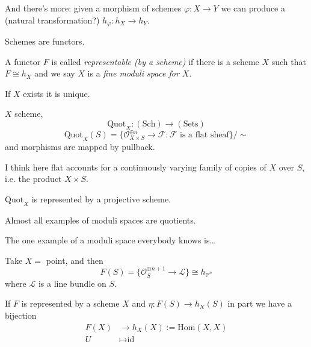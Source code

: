 And there's more: given a morphism of schemes $\varphi:X\to Y$ we can produce a
(natural transformation?) $h_\varphi:h_X \to h_Y$.

\begin{slogan}
Schemes are functors.
\end{slogan}

\begin{definition}
\label{definition-representable-functor-by-scheme}
A functor $F$ is called {\it representable (by a scheme)} if there is a scheme
$X$ such that $F\cong h_X$ and we say $X$ is a {\it fine moduli space for $X$}.
\end{definition}

\begin{remark}
\label{remark-uniqueness-of-representable-functor}
If $X$ exists it is unique.
\end{remark}

\begin{example}
\label{example-quotient-sheaf}
$X$ scheme,
$$
\text{Quot}_X:(\text{Sch})\to (\text{Sets})
$$
$$
\text{Quot}_X(S)=\{
\mathcal{O}_{X \times S}^{\oplus n}\to\mathcal{F}
:\mathcal{F} \text{ is a flat sheaf}\}\Big/ \sim
$$
and morphisms are mapped by pullback.
\end{example}

I think here flat accounts for a continuously varying family of copies of $X$
over $S$, i.e. the product $X \times S$.

\begin{theorem}
\label{theorem-Quot-is-represented}
$\text{Quot}_X$ is represented by a projective scheme.
\end{theorem}

Almost all examples of moduli spaces are quotients.

\medskip\noindent

The one example of a moduli space everybody knows is…

\begin{example}
\label{example-projective-space-is-a-quotient}
Take $X=$ point, and then
$$
F(S)=\{\mathcal{O}_S^{\oplus n+1}\to \mathcal{L}\}\cong h_{\mathbb{P}^n}
$$
where $\mathcal{L}$ is a line bundle on $S$.
\end{example}

\begin{definition}
\label{definition-universal-family}
If $F$ is represented by a scheme $X$ and $\eta:F(S)\to h_X(S)$ in part we have
a bijection
\begin{align*}
F(X) &\longrightarrow h_X(X):=\text{Hom}(X,X) \\
U &\longmapsto \text{id}
\end{align*}
\end{definition}

